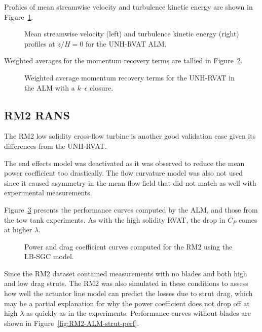 Profiles of mean streamwise velocity and turbulence kinetic energy are shown in
Figure~\ref{fig:RVAT-ALM-profiles}.

\begin{figure}
    \centering
    
    \caption{Mean streamwise velocity (left) and turbulence kinetic energy
        (right) profiles at $z/H=0$ for the UNH-RVAT ALM.}
    
    \label{fig:RVAT-ALM-profiles}
\end{figure}


Weighted averages for the momentum recovery terms are tallied in
Figure~\ref{fig:RVAT-ALM-recovery}.

\begin{figure}
    \caption{Weighted average momentum recovery terms for the UNH-RVAT in the
        ALM with a $k$--$\epsilon$ closure.}
    
    \label{fig:RVAT-ALM-recovery}
\end{figure}


\subsection{RM2 RANS}

The RM2 low solidity cross-flow turbine is another good validation case given
its differences from the UNH-RVAT.

The end effects model was deactivated as it was observed to reduce the mean
power coefficient too drastically. The flow curvature model was also not used
since it caused asymmetry in the mean flow field that did not match as well with
experimental measurements.


Figure~\ref{fig:RM2-ALM-perf-curves} presents
the performance curves computed by the ALM, and those from the tow tank
experiments. As with the high solidity RVAT, the drop in $C_P$ comes at higher
$\lambda$.

\begin{figure}
    \caption{Power and drag coefficient curves computed for the RM2 using the
        LB-SGC model.}
    
    \label{fig:RM2-ALM-perf-curves}
\end{figure}

Since the RM2 dataset contained measurements with no blades and both high and
low drag struts. The RM2 was also simulated in these conditions to assess how
well the actuator line model can predict the losses due to strut drag, which may
be a partial explanation for why the power coefficient does not drop off at high
$\lambda$ as quickly as in the experiments. Performance curves without blades
are shown in Figure~\ref{fig:RM2-ALM-strut-perf}.

